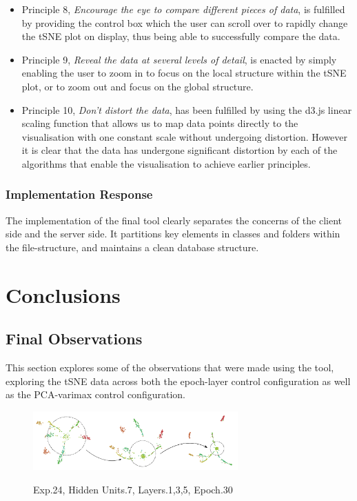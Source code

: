 \documentclass[a4paper,11pt,titlepage]{article}
\begin{document}
\begin{itemize}
		\item Principle 8, \textit{Encourage the eye to compare different pieces of data}, is fulfilled by providing the control box which the user can scroll over to rapidly change the tSNE plot on display, thus being able to successfully compare the data.
		\item Principle 9, \textit{Reveal the data at several levels of detail}, is enacted by simply enabling the user to zoom in to focus on the local structure within the tSNE plot, or to zoom out and focus on the global structure.
		\item Principle 10, \textit{Don't distort the data}, has been fulfilled by using the d3.js linear scaling function that allows us to map data points directly to the visualisation with one constant scale without undergoing distortion. However it is clear that the data has undergone significant distortion by each of the algorithms that enable the visualisation to achieve earlier principles.
	\end{itemize}
	
	\subsubsection{Implementation Response}
	The implementation of the final tool clearly separates the concerns of the client side and the server side. It partitions key elements in classes and folders within the file-structure, and maintains a clean database structure.
	
\clearpage 

\section{Conclusions}
	
	\subsection{Final Observations}
	This section explores some of the observations that were made using the tool, exploring the tSNE data across both the epoch-layer control configuration as well as the PCA-varimax control configuration.
	
	\begin{figure}[H]
    			\centering	
			{{\includegraphics[width=0.7\textwidth]
    				{img/conc_X24_H7_L1-3-5_E30.png} 
    			}}%
    			\caption{Exp.24, Hidden Units.7, Layers.1,3,5, Epoch.30}%
    		\label{fig:mnistHinton}
	\end{figure}
	
\end{document}
